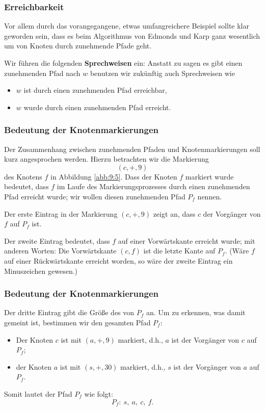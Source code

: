 \documentclass[smaller]{beamer}
\begin{document}
\begin{frame}
 \frametitle{Erreichbarkeit}
 Vor allem durch das vorangegangene, etwas umfangreichere Beispiel sollte klar geworden sein, dass es beim Algorithmus von Edmonds und Karp ganz wesentlich um  von Knoten durch zunehmende Pfade geht. \\ \vspace*{0.2cm}

Wir führen die folgenden \textbf{Sprechweisen} ein: Anstatt zu sagen {\glqq}es gibt einen zunehmenden Pfad nach $w${\grqq} benutzen wir zukünftig auch Sprechweisen wie \\ \vspace*{0.2cm} 
\begin{itemize}
\item {\glqq}$w$ ist durch einen zunehmenden Pfad erreichbar{\grqq}, 
\item {\glqq}$w$ wurde durch einen zunehmenden Pfad erreicht{\grqq}.
\end{itemize}
\end{frame}

\begin{frame}
 \frametitle{Bedeutung der Knotenmarkierungen}
 Der Zusammenhang zwischen zunehmenden Pfaden und Knotenmarkierungen soll kurz angesprochen werden. Hierzu betrachten wir die Markierung
\[
(c,+,9)
\]
des Knotens $f$ in Abbildung \ref{abb:9:5}. Dass der Knoten $f$ markiert wurde bedeutet, dass $f$ im Laufe des Markierungsprozesses durch einen zunehmenden Pfad erreicht wurde; wir wollen diesen zunehmenden Pfad $P_f$ nennen. \\ \vspace*{0.2cm}

Der \alert{erste Eintrag} in der Markierung $(c,+,9)$ zeigt an, dass $c$ der Vorgänger von $f$ auf $P_f$ ist. \\ \vspace*{0.2cm}

Der \alert{zweite Eintrag} bedeutet, dass $f$ auf einer Vorwärtskante erreicht wurde; mit anderen Worten: Die Vorwärtskante $(c,f)$ ist die letzte Kante auf $P_f$. (Wäre $f$ auf einer Rückwärtskante erreicht worden, so wäre der zweite Eintrag ein Minuszeichen gewesen.)
\end{frame}

\begin{frame}
 \frametitle{Bedeutung der Knotenmarkierungen}
 Der \alert{dritte Eintrag} gibt die Größe des  von $P_f$ an. Um zu erkennen, was damit gemeint ist, bestimmen wir den gesamten Pfad $P_f$: \vspace*{0.2cm}
 \begin{itemize}
 \item Der Knoten $c$ ist mit $(a,+,9)$ markiert, d.h.,  $a$ ist der Vorgänger von $c$ auf $P_f$; 
 \item der Knoten $a$ ist mit $(s,+,30)$ markiert, d.h., $s$ ist der Vorgänger von $a$ auf $P_f$.
 \end{itemize}
 
 \vspace*{0.2cm}
 Somit lautet der Pfad $P_f$ wie folgt:
 \[
 P_f:\ s,\ a,\ c,\ f.
 \]
\end{frame}
\end{document}
